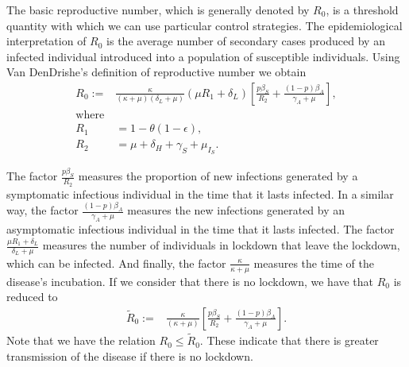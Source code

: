 %
The basic reproductive number, which is generally denoted by $ R_0 $,
is a threshold quantity with which we can use
particular control strategies. The epidemiological interpretation of
$ R_0 $ is the average number of secondary cases produced by an infected
individual introduced into a population of susceptible individuals.
Using Van DenDrishe's \cite{Van2002} definition of reproductive
number we obtain
\begin{equation*}
    \label{eqn:reproductive_number}
    \begin{aligned}
        R_0 :=
        &
        \frac{\kappa}{(\kappa + \mu)(\delta_L + \mu)}
        \left(
        \mu R_1 + \delta_L
        \right)
        \left[
        \frac{p\beta_S}{R_2}
        +\frac{(1 - p) \beta_A}{\gamma_A+\mu}
        \right],
        \\
        \text{where} &
        \\
        R_1 &= 1 - \theta(1 - \epsilon),
        \\
        R_2 &= \mu + \delta_H + \gamma_S + \mu_{I_{S}}.
    \end{aligned}
\end{equation*}

The factor $\frac{p\beta_S}{R_2}$ measures the proportion of new infections
generated by a symptomatic infectious individual in the time that it lasts
infected. In a similar way, the factor $\frac{(1 - p) \beta_A}{\gamma_A+\mu}$
measures the new infections generated by an asymptomatic infectious individual
in the time that it lasts infected. The factor
$\frac{\mu R_1 + \delta_L}{\delta_L + \mu}$ measures the number
of individuals in lockdown that leave the lockdown, which can be infected.
And finally, the factor $\frac{\kappa}{\kappa + \mu}$ measures
the time of the disease's incubation.
%
If we consider that there is no lockdown, we have that $ R_0 $ is reduced to
\begin{equation*}
    \label{eqn:reproductive_number}
    \begin{aligned}
        \tilde{R}_0 :=
        &
        \frac{\kappa}{(\kappa + \mu)}
        \left[
        \frac{p\beta_S}{R_2}
        +\frac{(1 - p) \beta_A}{\gamma_A+\mu}
        \right].
    \end{aligned}
\end{equation*}
%
Note that we have the relation $ R_0 \leq \tilde{R}_0 $. These indicate that
there is greater transmission of the disease if there is no lockdown.

